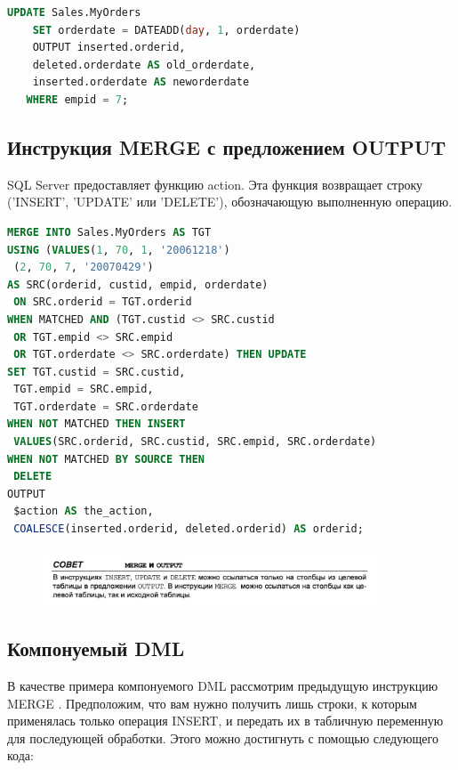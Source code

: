 \begin{lstlisting}[label=lst:funcReturn, language=sql]
	UPDATE Sales.MyOrders
	SET orderdate = DATEADD(day, 1, orderdate)
	OUTPUT inserted.orderid,
	deleted.orderdate AS old_orderdate,
	inserted.orderdate AS neworderdate
   WHERE empid = 7; 
\end{lstlisting}

\subsection{Инструкция MERGE с предложением OUTPUT}

SQL Server предоставляет функцию action. Эта функция возвращает строку
('INSERT', 'UPDATE' или 'DELETE'), обозначающую выполненную операцию. 

\begin{lstlisting}[label=lst:funcReturn, language=sql]
MERGE INTO Sales.MyOrders AS TGT
USING (VALUES(1, 70, 1, '20061218')
 (2, 70, 7, '20070429')
AS SRC(orderid, custid, empid, orderdate)
 ON SRC.orderid = TGT.orderid
WHEN MATCHED AND (TGT.custid <> SRC.custid
 OR TGT.empid <> SRC.empid
 OR TGT.orderdate <> SRC.orderdate) THEN UPDATE
SET TGT.custid = SRC.custid,
 TGT.empid = SRC.empid,
 TGT.orderdate = SRC.orderdate
WHEN NOT MATCHED THEN INSERT
 VALUES(SRC.orderid, SRC.custid, SRC.empid, SRC.orderdate)
WHEN NOT MATCHED BY SOURCE THEN
 DELETE
OUTPUT
 $action AS the_action,
 COALESCE(inserted.orderid, deleted.orderid) AS orderid; 
\end{lstlisting}

\begin{figure}[h!]
	\begin{center}
		\includegraphics[width=0.9\textwidth]{img/advice24.png}
	\end{center}
	\captionsetup{justification=centering}
\end{figure}


\subsection{Компонуемый DML }

В качестве примера компонуемого DML рассмотрим предыдущую инструкцию MERGE . Предположим, что вам нужно получить лишь строки, к которым
применялась только операция INSERT, и передать их в табличную переменную для последующей обработки. Этого можно достигнуть с помощью следующего
кода: 

